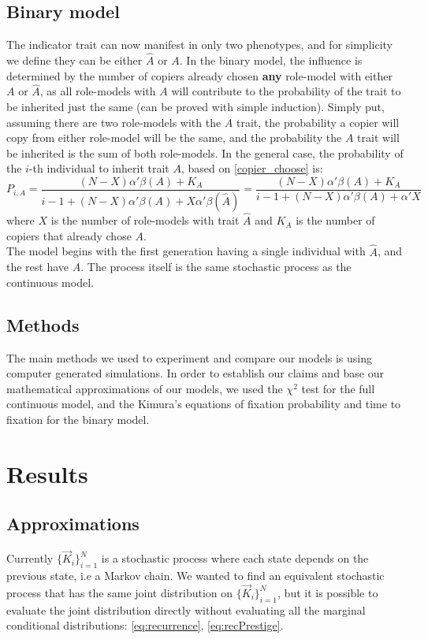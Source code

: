\documentclass[11pt]{article}
\begin{document}
\subsection{Binary model} The indicator trait can now manifest in only two phenotypes, and for simplicity we define they can be either $\hat{A}$ or $A$. In the binary model, the influence is determined by the number of copiers already chosen \textbf{any} role-model with either $A$ or $\hat{A}$, as all role-models with $A$ will contribute to the probability of the trait to be inherited just the same (can be proved with simple induction). Simply put, assuming there are two role-models with the $A$ trait, the probability a copier will copy from either role-model will be the same, and the probability the $A$ trait will be inherited is the sum of both role-models.
In the general case, the probability of the $i$-th individual to inherit trait $A$, based on \cref{copier_choose} is:
\begin{equation}\label{eq:binary-model}
P_{i,A} = \frac{(N-X)\alpha'\beta(A) + K_A}{i-1 + (N-X)\alpha'\beta(A) + X\alpha'\beta(\hat{A})} = \frac{(N-X)\alpha'\beta(A) + K_A}{i-1 + (N-X)\alpha'\beta(A) + \alpha'X}
\end{equation}
where $X$ is the number of role-models with trait $\hat{A}$ and $K_A$ is the number of copiers that already chose $A$.\\
The model begins with the first generation having a single individual with $\hat{A}$, and the rest have $A$. The process itself is the same stochastic process as the continuous model.

\subsection{Methods}
The main methods we used to experiment and compare our models is using computer generated simulations. In order to establish our claims and base our mathematical approximations of our models, we used the $\chi^2$ test for the full continuous model, and the Kimura's equations of fixation probability and time to fixation for the binary model.

\section{Results}
\subsection{Approximations}
Currently $\big\{\vec{K}_i\big\}_{i=1}^N$ is a stochastic process where each state depends on the previous state, i.e a Markov chain.
We wanted to find an equivalent stochastic process that has the same joint distribution on $\big\{\vec{K}_i\big\}_{i=1}^N$, but it is possible to evaluate the joint distribution directly without evaluating all the marginal conditional distributions: \cref{eq:recurrence}, \cref{eq:recPrestige}.
\end{document}
